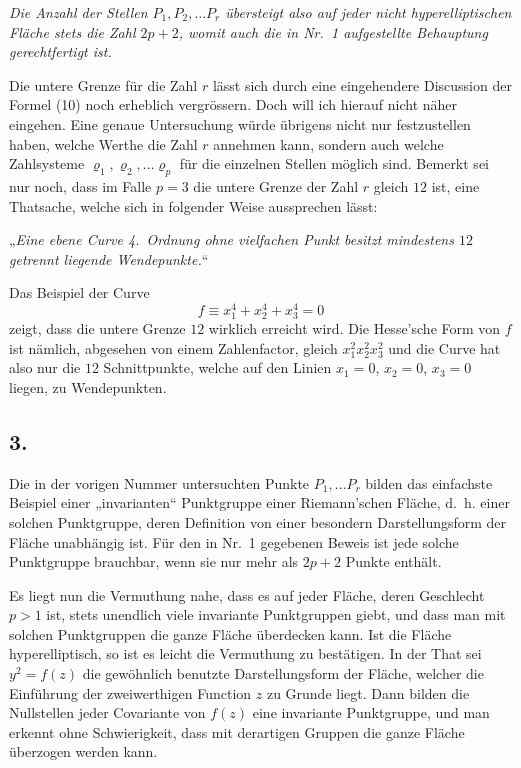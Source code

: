 \documentclass{article}
\begin{document}
\emph{Die Anzahl der Stellen $P_1, P_2, \dots P_r$ übersteigt also auf jeder nicht hyperelliptischen Fläche stets die Zahl $2p+2$, womit auch die in Nr.~1 aufgestellte Behauptung gerechtfertigt ist.}

Die untere Grenze für die Zahl $r$ lässt sich durch eine eingehendere Discussion der Formel (10) noch erheblich vergrössern. Doch will ich hierauf nicht näher eingehen. Eine genaue Untersuchung würde übrigens nicht nur festzustellen haben, welche Werthe die Zahl $r$ annehmen kann, sondern auch welche Zahlsysteme $\varrho_1, \varrho_2, \dots \varrho_p$ für die einzelnen Stellen möglich sind. Bemerkt sei nur noch, dass im Falle $p = 3$ die untere Grenze der Zahl $r$ gleich $12$ ist, eine Thatsache, welche sich in folgender Weise aussprechen lässt:

„\emph{Eine ebene Curve 4.~Ordnung ohne vielfachen Punkt besitzt mindestens $12$ getrennt liegende Wendepunkte.}“

Das Beispiel der Curve
\[
f \equiv x_1^4 + x_2^4 + x_3^4 = 0
\]
zeigt, dass die untere Grenze $12$ wirklich erreicht wird. Die Hesse'sche Form von $f$ ist nämlich, abgesehen von einem Zahlenfactor, gleich $x_1^2 x_2^2 x_3^2$ und die Curve hat also nur die $12$ Schnittpunkte, welche auf den Linien $x_1 = 0$, $x_2 = 0$, $x_3 = 0$ liegen, zu Wendepunkten.

\subsection*{3.}

Die in der vorigen Nummer untersuchten Punkte $P_1, \dots P_r$ bilden das einfachste Beispiel einer „invarianten“ Punktgruppe einer Riemann'schen Fläche, d.~h. einer solchen Punktgruppe, deren Definition von einer besondern Darstellungsform der Fläche unabhängig ist. Für den in Nr.~1 gegebenen Beweis ist jede solche Punktgruppe brauchbar, wenn sie nur mehr als $2p+2$ Punkte enthält.

Es liegt nun die Vermuthung nahe, dass es auf jeder Fläche, deren Geschlecht $p > 1$ ist, stets unendlich viele invariante Punktgruppen giebt, und dass man mit solchen Punktgruppen die ganze Fläche überdecken kann. Ist die Fläche hyperelliptisch, so ist es leicht die Vermuthung zu bestätigen. In der That sei $y^2 = f(z)$ die gewöhnlich benutzte Darstellungsform der Fläche, welcher die Einführung der zweiwerthigen Function $z$ zu Grunde liegt. Dann bilden die Nullstellen jeder Covariante von $f(z)$ eine invariante Punktgruppe, und man erkennt ohne Schwierigkeit, dass mit derartigen Gruppen die ganze Fläche überzogen werden kann.
\end{document}
